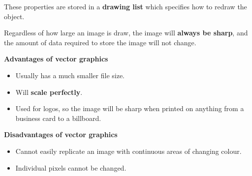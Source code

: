 These properties are stored in a \textbf{drawing list} which specifies how to redraw the object.

Regardless of how large an image is draw, the image will \textbf{always be sharp}, and the amount of data required to store the image will not change.

\textbf{Advantages of vector graphics}
\begin{itemize}
    \item Usually has a much smaller file size.
    \item Will \textbf{scale perfectly}.
    \item Used for logos, so the image will be sharp when printed on anything from a business card to a billboard.
\end{itemize}

\textbf{Disadvantages of vector graphics}
\begin{itemize}
    \item Cannot easily replicate an image with continuous areas of changing colour.
    \item Individual pixels cannot be changed.
\end{itemize}
